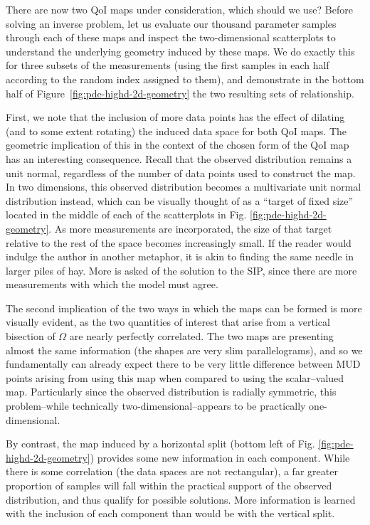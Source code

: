 There are now two QoI maps under consideration, which should we use?
Before solving an inverse problem, let us evaluate our thousand parameter samples through each of these maps and inspect the two-dimensional scatterplots to understand the underlying geometry induced by these maps.
We do exactly this for three subsets of the measurements (using the first samples in each half according to the random index assigned to them), and demonstrate in the bottom half of Figure~\ref{fig:pde-highd-2d-geometry} the two resulting sets of relationship.

First, we note that the inclusion of more data points has the effect of dilating (and to some extent rotating) the induced data space for both QoI maps.
The geometric implication of this in the context of the chosen form of the QoI map has an interesting consequence.
Recall that the observed distribution remains a unit normal, regardless of the number of data points used to construct the map.
In two dimensions, this observed distribution becomes a multivariate unit normal distribution instead, which can be visually thought of as a ``target of fixed size'' located in the middle of each of the scatterplots in Fig. \ref{fig:pde-highd-2d-geometry}.
As more measurements are incorporated, the size of that target relative to the rest of the space becomes increasingly small.
If the reader would indulge the author in another metaphor, it is akin to finding the same needle in larger piles of hay.
More is asked of the solution to the SIP, since there are more measurements with which the model must agree.

The second implication of the two ways in which the maps can be formed is more visually evident, as the two quantities of interest that arise from a vertical bisection of $\Omega$ are nearly perfectly correlated.
The two maps are presenting almost the same information (the shapes are very slim parallelograms), and so we fundamentally can already expect there to be very little difference between MUD points arising from using this map when compared to using the scalar--valued map.
Particularly since the observed distribution is radially symmetric, this problem\---while technically two-dimensional\---appears to be practically one-dimensional.

By contrast, the map induced by a horizontal split (bottom left of Fig. \ref{fig:pde-highd-2d-geometry}) provides some new information in each component.
While there is some correlation (the data spaces are not rectangular), a far greater proportion of samples will fall within the practical support of the observed distribution, and thus qualify for possible solutions.
More information is learned with the inclusion of each component than would be with the vertical split.

